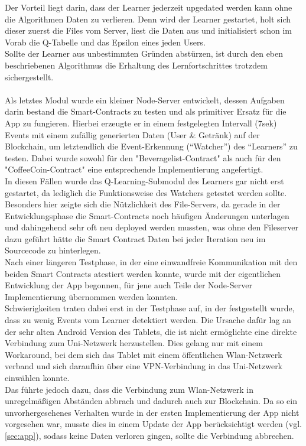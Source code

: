 Der Vorteil liegt darin, dass der Learner jederzeit upgedated werden kann ohne die Algorithmen Daten zu verlieren. Denn wird der Learner gestartet, holt sich dieser zuerst die Files vom Server, liest die Daten aus und initialisiert schon im Vorab die Q-Tabelle und das Epsilon eines jeden Users. \\
Sollte der Learner aus unbestimmten Gründen abstürzen, ist durch den eben beschriebenen Algorithmus die Erhaltung des Lernfortschrittes trotzdem sichergestellt.\\\\
Als letztes Modul wurde ein kleiner Node-Server entwickelt, dessen Aufgaben darin bestand die Smart-Contracts zu testen und als primitiver Ersatz für die App zu fungieren. Hierbei erzeugte er in einem festgelegten Intervall (7sek) Events mit einem zufällig generierten Daten (User \& Getränk) auf der Blockchain, um letztendlich die Event-Erkennung (“Watcher”) des “Learners” zu testen. Dabei wurde sowohl für den "Beveragelist-Contract" als auch für den "CoffeeCoin-Contract" eine entsprechende Implementierung angefertigt.
\\In diesen Fällen wurde das Q-Learning-Submodul des Learners gar nicht erst gestartet, da lediglich die Funktionsweise des Watchers getestet werden sollte.\\
Besonders hier zeigte sich die Nützlichkeit des File-Servers, da gerade in der Entwicklungsphase die Smart-Contracts noch häufigen Änderungen unterlagen und dahingehend sehr oft neu deployed werden mussten, was ohne den Fileserver dazu geführt hätte die Smart Contract Daten bei jeder Iteration neu im Sourcecode zu hinterlegen.\\
Nach einer längeren Testphase, in der eine einwandfreie Kommunikation mit den beiden Smart Contracts atestiert werden konnte, wurde mit der eigentlichen Entwicklung der App begonnen, für jene auch Teile der Node-Server Implementierung übernommen werden konnten.\\
Schwierigkeiten traten dabei erst in der Testphase auf, in der festgestellt wurde, dass zu wenig Events vom Learner detektiert werden. Die Ursache dafür lag an der sehr alten Android Version des Tablets, die ist nicht ermöglichte eine direkte Verbindung zum Uni-Netzwerk herzustellen. Dies gelang nur mit einem Workaround, bei dem sich das Tablet mit einem öffentlichen Wlan-Netzwerk verband und sich daraufhin über eine VPN-Verbindung in das Uni-Netzwerk einwählen konnte. \\
Das führte jedoch dazu, dass die Verbindung zum Wlan-Netzwerk in unregelmäßigen Abständen abbrach und dadurch auch zur Blockchain. Da so ein unvorhergesehenes Verhalten wurde in der ersten Implementierung der App nicht vorgesehen war, musste dies in einem Update der App berücksichtigt werden (vgl. \ref{sec:app}), sodass keine Daten verloren gingen, sollte die Verbindung abbrechen. \\
